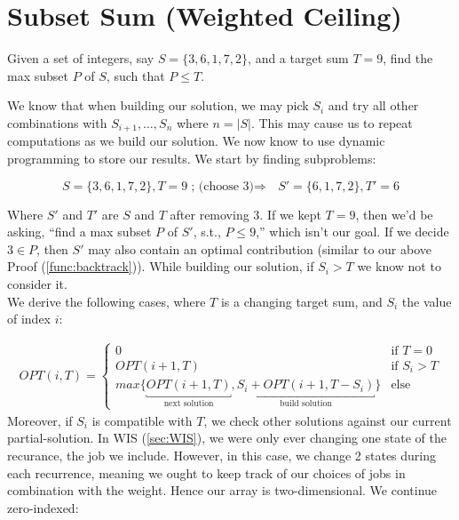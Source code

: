 \section{Subset Sum (Weighted Ceiling)}


\begin{Def}

Given a set of integers, say $S=\{3,6,1,7,2\}$, and a target sum $T=9$, find the max subset $P$ of $S$, such that $P\leq T$.
\end{Def}

\noindent
We know that when building our solution, we may pick $S_i$ and try all other combinations with $S_{i+1},\dots,S_n$ where $n=|S|$.
This may cause us to repeat computations as we build our solution. We now know to use dynamic programming to store our results. We
start by finding subproblems:

\[
    S=\{3,6,1,7,2\}, T=9 \text{; (choose 3)$\Rightarrow$ } S'=\{6,1,7,2\}, T'=6
\]

\noindent
Where $S'$ and $T'$ are $S$ and $T$ after removing 3. If we kept $T=9$, then we'd be asking, ``find a max subset $P$ of $S'$, s.t., $P\leq 9$,'' which
isn't our goal. If we decide $3\in P$, then $S'$ may also contain an optimal contribution (similar to our above Proof (\ref{func:backtrack})). While
building our solution, if $S_i>T$ we know not to consider it.\\

\noindent
We derive the following cases, where $T$ is a changing target sum, and $S_i$ the value of index $i$:

\begin{align*}
    OPT(i, T) =
    \begin{cases}
        0 & \text{if $T=0$}\\
        OPT(i+1, T) & \text{if $S_i > T$}\\
        max\{\underbracket{OPT(i+1, T)}_{\text{next solution}}, \underbracket{S_i+OPT(i+1, T-S_i)}_{\text{build solution}}\} & \text{else}
    \end{cases}
\end{align*}
\noindent
Moreover, if $S_i$ is compatible with $T$, we check other solutions against our current partial-solution.
In WIS (\ref{sec:WIS}), we were only ever changing one state of the recurance, the job we include.
However, in this case, we change 2 states during each recurrence, meaning we ought to keep track of our choices of jobs in combination with the weight. 
Hence our array is two-dimensional. We continue zero-indexed:

